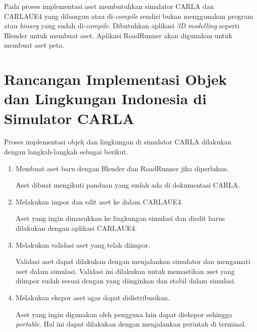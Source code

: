Pada proses implementasi aset membutuhkan simulator CARLA dan CARLAUE4 yang
dibangun atau di-\textit{compile} sendiri bukan menggunakan program atau
\textit{binary} yang sudah di-\textit{compile}.
Dibutuhkan aplikasi \textit{3D modelling} seperti Blender untuk membuat aset.
Aplikasi RoadRunner akan digunakan untuk membuat aset peta.

\section{Rancangan Implementasi Objek dan Lingkungan Indonesia di Simulator CARLA}

Proses implementasi objek dan lingkungan di simulator CARLA dilakukan dengan
langkah-langkah sebagai berikut.

\begin{enumerate}

	\item Membuat aset baru dengan Blender dan RoadRunner jika diperlukan.

	Aset dibuat mengikuti panduan yang sudah ada di dokumentasi CARLA.

	\item Melakukan impor dan edit aset ke dalam CARLAUE4.

	Aset yang ingin dimasukkan ke lingkungan simulasi dan diedit harus dilakukan
	dengan aplikasi CARLAUE4.



	\item Melakukan validasi aset yang telah diimpor.

	Validasi aset dapat dilakukan dengan menjalankan simulator dan mengamati
	aset dalam simulasi. Validasi ini dilakukan untuk memastikan aset yang
	diimpor sudah sesuai dengan yang diinginkan dan stabil dalam simulasi.

	\item Melakukan ekspor aset agar dapat didistribusikan.

	Aset yang ingin digunakan oleh pengguna lain dapat diekspor sehingga
	\textit{portable}. Hal ini dapat dilakukan dengan menjalankan perintah di
	terminal.

\end{enumerate}


